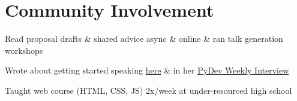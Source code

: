 \documentclass[letterpaper]{deedy-resume} %
\begin{document}
\begin{minipage}[t]{0.66\textwidth}
\section{Community Involvement}

%
\begin{tightitemize}
\item Read proposal drafts \& shared advice async \& online \& ran talk generation workshops
\item Wrote about getting started speaking \href{}{here} \& in her \href{}{PyDev Weekly Interview} 
\end{tightitemize}
%
\sectionspace %


%
%
\sectionspace %
\vspace{0.2\baselineskip}

%
\begin{tightitemize}
\item Taught web course (HTML, CSS, JS) 2x/week at under-resourced high school
\end{tightitemize}
%
\sectionspace %


%
%


\end{minipage}
\end{document}

